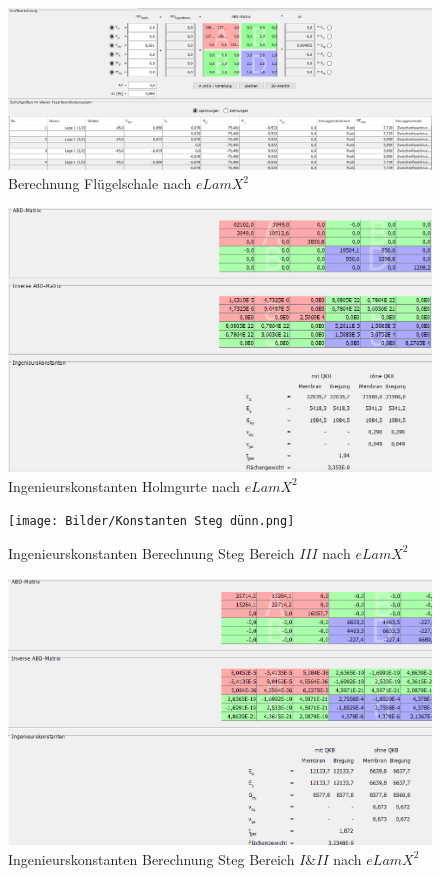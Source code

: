 \begin{figure}[h]
	\includegraphics[width=1.0\textwidth]{Bilder/Berechnung Haut.png}
	\caption{Berechnung Flügelschale nach $eLamX^{2}$}
	\label{fig:Berechnung Haut}
\end{figure}
\begin{figure}[h]
	\includegraphics[width=1.0\textwidth]{Bilder/Konstanten Holmgurte.png}
	\caption{Ingenieurskonstanten Holmgurte nach $eLamX^{2}$}
	\label{fig:Ingenieurskonstanten Holmgurte}
\end{figure}
\begin{figure}[h]
	\texttt{[image: Bilder/Konstanten Steg dünn.png]}
	\caption{Ingenieurskonstanten Berechnung Steg Bereich $III$ nach $eLamX^{2}$}
	\label{fig:Ingenieurskonstanten Steg dünn}
\end{figure}
\begin{figure}[h]
	\includegraphics[width=1.0\textwidth]{Bilder/Konstanten Steg dick.png}
	\caption{Ingenieurskonstanten Berechnung Steg Bereich $I\&II$ nach $eLamX^{2}$}
	\label{fig:Ingenieurskonstanten Steg dick}
\end{figure}
